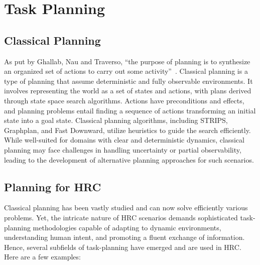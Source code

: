 \section{Task Planning}

\subsection{Classical Planning}

As put by Ghallab, Nau and Traverso, “the purpose of planning is to synthesize an organized set of actions to carry out some activity”~\cite{ghallab2016automated}. 
Classical planning is a type of planning that assume deterministic and fully observable environments. It involves representing the world as a set of states and actions, with plans derived through state space search algorithms. Actions have preconditions and effects, and planning problems entail finding a sequence of actions transforming an initial state into a goal state. Classical planning algorithms, including STRIPS, Graphplan, and Fast Downward, utilize heuristics to guide the search efficiently. While well-suited for domains with clear and deterministic dynamics, classical planning may face challenges in handling uncertainty or partial observability, leading to the development of alternative planning approaches for such scenarios.

\subsection{Planning for HRC}

Classical planning has been vastly studied and can now solve efficiently various problems. Yet, the intricate nature of HRC scenarios demands sophisticated task-planning methodologies capable of adapting to dynamic environments, understanding human intent, and promoting a fluent exchange of information. Hence, several subfields of task-planning have emerged and are used in HRC. Here are a few examples:

